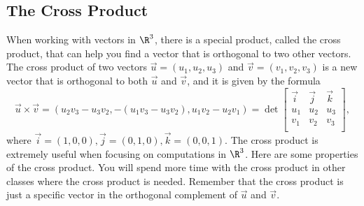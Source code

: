 \subsection{The Cross Product}
When working with vectors in $\R^3$, there is a special product, called the cross product, that can help you find a vector that is orthogonal to two other vectors. 
The cross product of two vectors $\vec u =(u_1,u_2,u_3)$ and $\vec v = (v_1,v_2,v_3)$ is a new vector that is orthogonal to both $\vec u$ and $\vec v$, and it is given by the formula
$$\vec u\times \vec v = (u_2v_3-u_3v_2,-(u_1v_3-u_3v_2),u_1v_2-u_2v_1) = \det\begin{bmatrix}\vec i & \vec j&\vec k\\ u_1&u_2&u_3\\ v_1&v_2&v_3\\\end{bmatrix},$$ where $\vec i = (1,0,0), \vec j = (0,1,0), \vec k = (0,0,1)$.
The cross product is extremely useful when focusing on computations in $\R^3$. Here are some properties of the cross product.  You will spend more time with the cross product in other classes where the cross product is needed.  Remember that the cross product is just a specific vector in the orthogonal complement of $\vec u$ and $\vec v$.  

